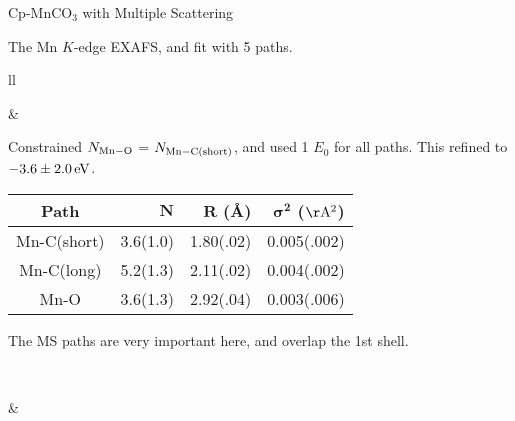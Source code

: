\begin{slide}{Cp-MnCO{$\mathrm{{}_3}$} with Multiple Scattering}

  The Mn $K$-edge EXAFS, and fit with 5 paths.

  \begin{tabular}{ll}
    \begin{minipage}{55mm} {}
    \end{minipage}
    &
    \begin{minipage}{55mm}  \setlength{\baselineskip}{10pt}

      Constrained $N_{\rm{Mn-O}}$ = $N_{\rm{Mn-C(short)}}$, and used
      1 $E_0$ for all paths. This refined to $-3.6\pm2.0\,\rm eV$.

      \vspace{1mm}
      {\tiny{

        \begin{center}
          \begin{tabular}{|c|rrr|}
          \hline
          Path & $\mathbf{N}$ & $\mathbf{R}$ (\AA) & $\mathbf{\sigma^2}$
          ($\mathbf{\rm\AA^2}$) \\
          \hline
          Mn-C(short) &  3.6(1.0) & 1.80(.02) & 0.005(.002)  \\
          Mn-C(long)  &  5.2(1.3) & 2.11(.02) & 0.004(.002)  \\
          Mn-O        &  3.6(1.3) & 2.92(.04) & 0.003(.006)  \\
          \hline
        \end{tabular}
        \end{center}
      }}

    \vspace{1mm} The MS paths are very important here,
    and  overlap the 1st shell.

    \vspace{2mm}
    \end{minipage}
    \\
    \begin{minipage}{55mm} {}
    \end{minipage}
    &
    \begin{minipage}{55mm} {}
    \end{minipage}
  \end{tabular}

  \vfill

\end{slide}
